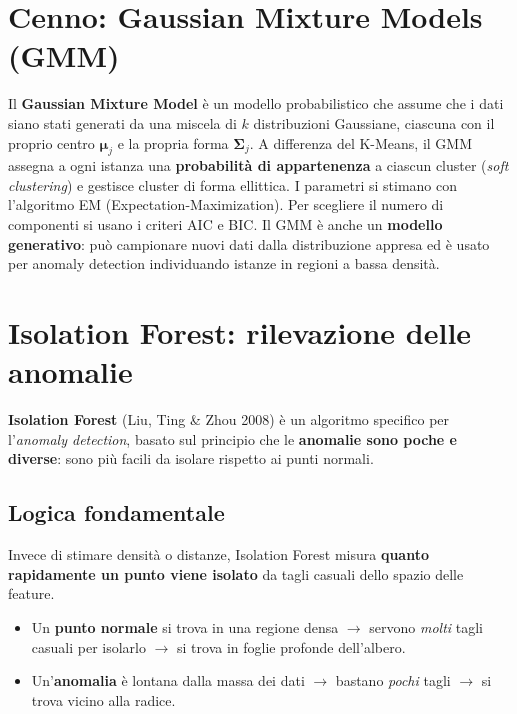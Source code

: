 \section{Cenno: Gaussian Mixture Models (GMM)}

Il \textbf{Gaussian Mixture Model} è un modello probabilistico che assume che i dati siano stati generati da una miscela di $k$ distribuzioni Gaussiane, ciascuna con il proprio centro $\boldsymbol{\mu}_j$ e la propria forma $\boldsymbol{\Sigma}_j$. A differenza del K-Means, il GMM assegna a ogni istanza una \textbf{probabilità di appartenenza} a ciascun cluster (\emph{soft clustering}) e gestisce cluster di forma ellittica. I parametri si stimano con l'algoritmo EM (Expectation-Maximization). Per scegliere il numero di componenti si usano i criteri AIC e BIC. Il GMM è anche un \textbf{modello generativo}: può campionare nuovi dati dalla distribuzione appresa ed è usato per anomaly detection individuando istanze in regioni a bassa densità.

\section{Isolation Forest: rilevazione delle anomalie}

\textbf{Isolation Forest} (Liu, Ting \& Zhou 2008) è un algoritmo specifico per l'\emph{anomaly detection}, basato sul principio che le \textbf{anomalie sono poche e diverse}: sono più facili da isolare rispetto ai punti normali.

\subsection{Logica fondamentale}

Invece di stimare densità o distanze, Isolation Forest misura \textbf{quanto rapidamente un punto viene isolato} da tagli casuali dello spazio delle feature.

\begin{itemize}
    \item Un \textbf{punto normale} si trova in una regione densa $\to$ servono \emph{molti} tagli casuali per isolarlo $\to$ si trova in foglie profonde dell'albero.
    \item Un'\textbf{anomalia} è lontana dalla massa dei dati $\to$ bastano \emph{pochi} tagli $\to$ si trova vicino alla radice.
\end{itemize}

